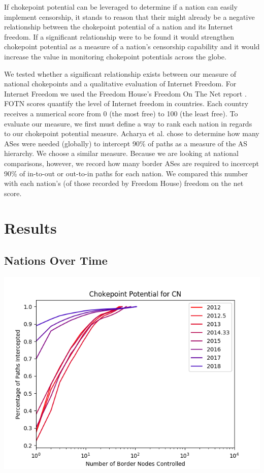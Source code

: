 \documentclass{article}
\newenvironment{Figure}
  {\par\medskip\noindent\minipage{\linewidth}}
  {\endminipage\par\medskip}
\begin{document}
\begin{multicols}{2}
If chokepoint potential can be leveraged to determine if a nation can easily implement censorship, it stands to reason that their might already be a negative relationship between
the chokepoint potential of a nation and its Internet freedom. If a significant relationship were to be found it would strengthen chokepoint potential as a measure of a nation's censorship capability
and it would increase the value in monitoring chokepoint potentials across the globe.
\par
We tested whether a significant relationship exists between our measure of national chokepoints and a qualitative evaluation of Internet Freedom. For Internet Freedom we used
the Freedom House's Freedom On The Net report \cite{FOTN}. FOTN scores quantify the level of Internet freedom in countries. Each country receives a numerical score from 0 (the most free)
to 100 (the least free).
 To evaluate our measure, we first must define a way to rank each nation in regards to our chokepoint potential measure.
Acharya et al. \cite{throats} chose to determine how many ASes were needed (globally) to intercept 90\% of paths as a measure of the AS hierarchy. We choose a similar measure. Because we are
looking at national comparisons, however, we record how many border ASes are required to incercept 90\% of in-to-out or out-to-in paths for each nation. We compared this number
with each nation's (of those recorded by Freedom House) freedom on the net score.

\section{Results}
\subsection{Nations Over Time}

\begin{Figure}
	\centering
	\includegraphics[width=\linewidth]{single_CN}
	\label{fig:ChinaChokePoint}
\end{Figure}


\end{multicols}
\end{document}

